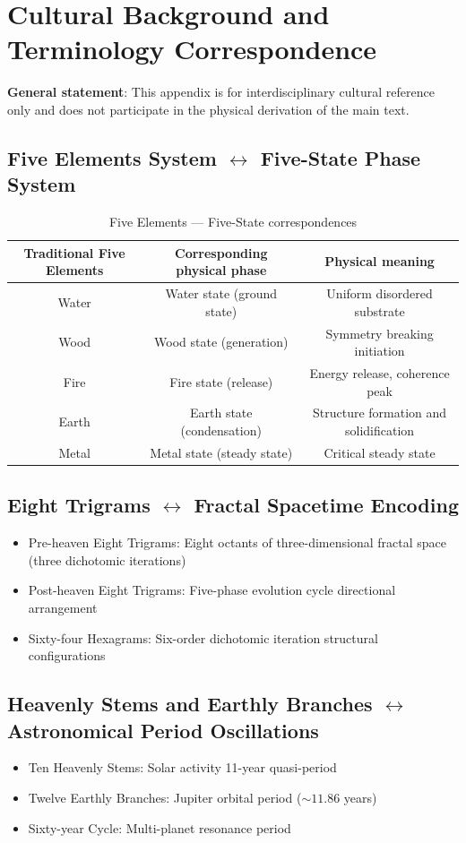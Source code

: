 \documentclass[12pt,a4paper,twocolumn]{article}
\begin{document}
\section{Cultural Background and Terminology Correspondence}
\label{app:culture}

\textbf{General statement}: This appendix is for interdisciplinary cultural reference only and does not participate in the physical derivation of the main text.

\subsection{Five Elements System $\leftrightarrow$ Five-State Phase System}
\begin{table}[H]
\centering
\footnotesize
\caption{Five Elements --- Five-State correspondences}
\begin{tabular}{c|c|c}
\hline
\textbf{Traditional Five Elements} & \textbf{Corresponding physical phase} & \textbf{Physical meaning} \\
\hline
Water & Water state (ground state) & Uniform disordered substrate \\
Wood & Wood state (generation) & Symmetry breaking initiation \\
Fire & Fire state (release) & Energy release, coherence peak \\
Earth & Earth state (condensation) & Structure formation and solidification \\
Metal & Metal state (steady state) & Critical steady state \\
\hline
\end{tabular}
\end{table}

\subsection{Eight Trigrams $\leftrightarrow$ Fractal Spacetime Encoding}
\begin{itemize}
\item Pre-heaven Eight Trigrams: Eight octants of three-dimensional fractal space (three dichotomic iterations)
\item Post-heaven Eight Trigrams: Five-phase evolution cycle directional arrangement
\item Sixty-four Hexagrams: Six-order dichotomic iteration structural configurations
\end{itemize}

\subsection{Heavenly Stems and Earthly Branches $\leftrightarrow$ Astronomical Period Oscillations}
\begin{itemize}
\item Ten Heavenly Stems: Solar activity 11-year quasi-period
\item Twelve Earthly Branches: Jupiter orbital period ($\sim11.86$ years)
\item Sixty-year Cycle: Multi-planet resonance period
\end{itemize}
\end{document}

